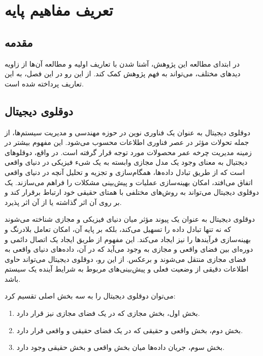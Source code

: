 

\chapter{تعریف مفاهیم پایه}
\section{مقدمه}
در ابتدای مطالعه این پژوهش، آشنا شدن با تعاریف اولیه و مطالعه آن‌ها از زاویه دید‌های مختلف، می‌تواند به فهم پژوهش کمک کند. از این رو در این فصل، به این تعاریف پرداخته شده است.
\section{دوقلوی دیجیتال}

دوقلوی دیجیتال به عنوان یک فناوری نوین در حوزه مهندسی و مدیریت سیستم‌ها، از جمله تحولات مؤثر در عصر فناوری اطلاعات محسوب می‌شود. این مفهوم بیشتر در زمینه مدیریت چرخه عمر محصولات
مورد توجه قرار گرفته است. 
در واقع، دوقلوهای دیجتیال به معنای وجود یک مدل مجازی وابسته به یک شیء فیزیکی در دنیای واقعی است که از طریق تبادل داده‌ها، همگام‌سازی و تجزیه و تحلیل آنچه در دنیای واقعی اتفاق می‌افتد، امکان بهینه‌سازی عملیات و پیش‌بینی مشکلات را فراهم می‌سازند. یک دوقلوی دیجیتال می‌تواند به روش‌های مختلفی با همتای حقیقی خود ارتباط برقرار کند و بر روی آن اثر گذاشته یا از آن اثر پذیرد.

دوقلوی دیجیتال به عنوان یک پیوند مؤثر میان دنیای فیزیکی و مجازی شناخته می‌شوند که نه تنها تبادل داده‌ را تسهیل می‌کند، بلکه بر پایه آن، امکان تعامل بلادرنگ و بهینه‌سازی فرآیندها را نیز ایجاد می‌کند.
\cite{b2}
این مفهوم از طریق ایجاد یک اتصال دائمی و دوره‌ای بین فضای واقعی و مجازی به وجود می‌آید که در آن، داده‌های دنیای واقعی به فضای مجازی منتقل می‌شوند و برعکس. 
از این رو، دوقلوی دیجیتال می‌تواند حاوی اطلاعات دقیقی از وضعیت فعلی و پیش‌بینی‌های مربوط به شرایط آینده یک سیستم باشد.

می‌توان دوقلوی دیجیتال را به سه بخش اصلی تقسیم کرد:
\cite{b2}
\begin{enumerate}
	\item 
	بخش اول، بخش مجازی که در یک فضای مجازی نیز قرار دارد.
	\item 
	بخش دوم، بخش واقعی و حقیقی که در یک فضای حقیقی و واقعی قرار دارد.
	\item 
	بخش سوم، جریان داده‌ها میان بخش واقعی و بخش حقیقی وجود دارد.
\end{enumerate}

